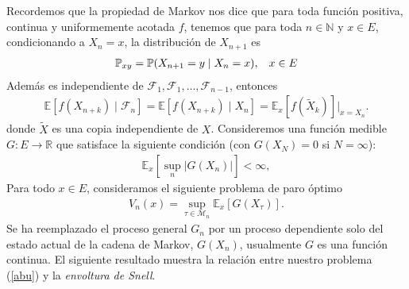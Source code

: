Recordemos que la propiedad de Markov nos dice que para toda función positiva, continua y uniformemente acotada $f$, tenemos que para toda $n \in \mathbb{N}$ y $x \in E$, condicionando a $X_n = x$, la distribución de $X_{n+1}$ es
	\begin{align*}
	\mathbb{P}_{xy} = \mathbb{P}(X_{n+1} = y \mid X_n = x), \hspace{0.3cm} x \in E
	\end{align*}
Además es independiente de $\mathcal{F}_1, \mathcal{F}_1, \ldots, \mathcal{F}_{n-1}$, entonces 
	\begin{align*}
	\mathbb{E}[f(X_{n+k}) \mid \mathcal{F}_n] = \mathbb{E}[f(X_{n+k}) \mid X_n] = \mathbb{E}_x [f(\tilde{X}_k)] \bigg|_{x = X_n}.
	\end{align*}
donde $\tilde{X}$ es una copia independiente de $X$. Consideremos una función medible $G : E \rightarrow \mathbb{R}$ que satisface la siguiente condición (con $G(X_N) = 0$ si $N = \infty$):
	\begin{align*}
	\mathbb{E}_x \left[ \sup_n |G(X_n)| \right] < \infty,
	\end{align*}
Para todo $x \in E$, consideramos el siguiente problema de paro óptimo
	\begin{align}
	V_n (x) = \sup_{\tau \in \mathcal{M}_n} \mathbb{E}_x [G(X_\tau)]. \label{abu}
	\end{align}
Se ha reemplazado el proceso general $G_n$  por un proceso dependiente solo del estado actual de la cadena de Markov, $G(X_n)$, usualmente $G$ es una función continua. El siguiente resultado muestra la relación entre nuestro problema (\ref{abu}) y la \emph{envoltura de Snell}.

